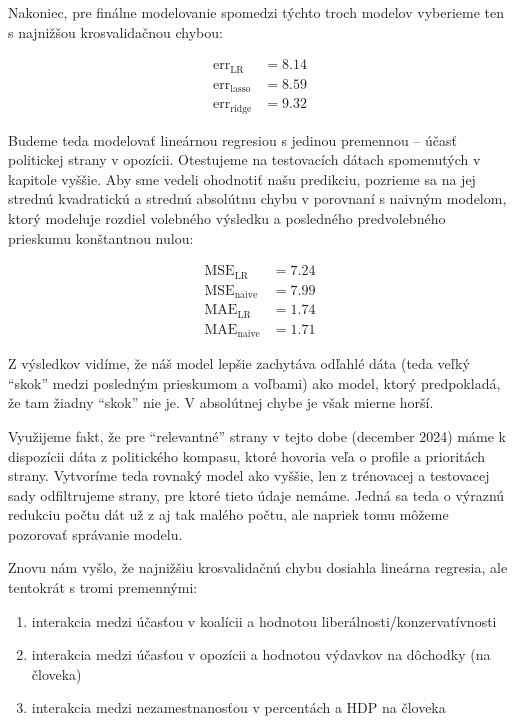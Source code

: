 \documentclass[main.tex]{subfiles}
\begin{document}
Nakoniec, pre finálne modelovanie spomedzi týchto troch modelov vyberieme ten s najnižšou krosvalidačnou chybou:

\begin{align*}
	\operatorname{err}_{\operatorname{LR}} &= 8.14 \\
	\operatorname{err}_{\operatorname{lasso}} &= 8.59 \\
	\operatorname{err}_{\operatorname{ridge}} &= 9.32
\end{align*}

Budeme teda modelovať lineárnou regresiou s jedinou premennou -- účasť politickej strany v opozícii. Otestujeme na testovacích dátach spomenutých v kapitole vyššie. Aby sme vedeli ohodnotiť našu predikciu, pozrieme sa na jej strednú kvadratickú a strednú absolútnu chybu v porovnaní s naivným modelom, ktorý modeluje rozdiel volebného výsledku a posledného predvolebného prieskumu konštantnou nulou:

\begin{align*}
	\operatorname{MSE}_{\operatorname{LR}} &= 7.24 \\
	\operatorname{MSE}_{\operatorname{naive}} &= 7.99 \\
	\operatorname{MAE}_{\operatorname{LR}} &= 1.74 \\
	\operatorname{MAE}_{\operatorname{naive}} &= 1.71
\end{align*}

Z výsledkov vidíme, že náš model lepšie zachytáva odľahlé dáta (teda veľký \enquote{skok} medzi posledným prieskumom a voľbami) ako model, ktorý predpokladá, že tam žiadny \enquote{skok} nie je. V absolútnej chybe je však mierne horší.

Využijeme fakt, že pre \enquote{relevantné} strany v tejto dobe (december 2024) máme k dispozícii dáta z politického kompasu, ktoré hovoria veľa o profile a prioritách strany. Vytvoríme teda rovnaký model ako vyššie, len z trénovacej a testovacej sady odfiltrujeme strany, pre ktoré tieto údaje nemáme. Jedná sa teda o výraznú redukciu počtu dát už z aj tak malého počtu, ale napriek tomu môžeme pozorovať správanie modelu.

\newpage

Znovu nám vyšlo, že najnižšiu krosvalidačnú chybu dosiahla lineárna regresia, ale tentokrát s tromi premennými:

\begin{enumerate}
	\item interakcia medzi účasťou v koalícii a hodnotou liberálnosti/konzervatívnosti
	\item interakcia medzi účasťou v opozícii a hodnotou výdavkov na dôchodky (na človeka)
	\item interakcia medzi nezamestnanosťou v percentách a HDP na človeka
\end{enumerate}
\end{document}
